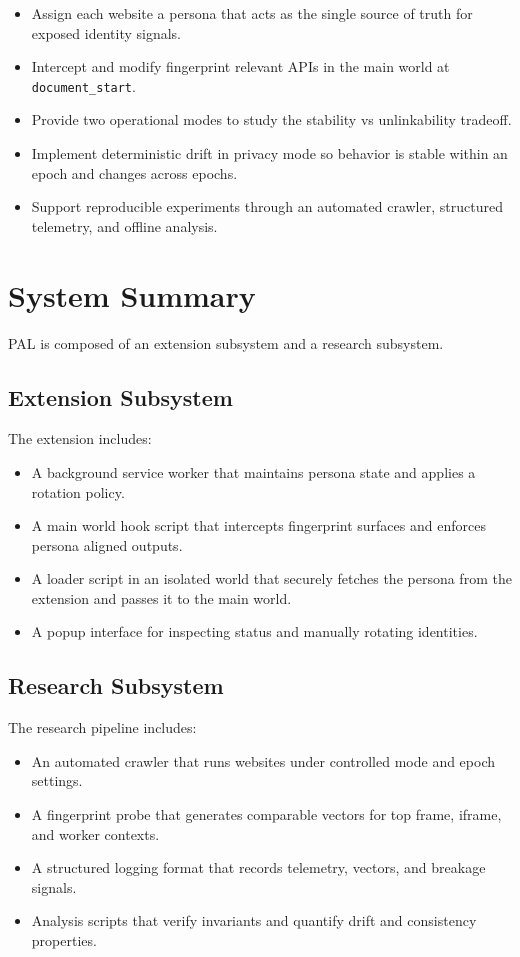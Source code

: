 \documentclass[11pt]{report}
\begin{document}
\begin{itemize}
    \item Assign each website a persona that acts as the single source of truth for exposed identity signals.
    \item Intercept and modify fingerprint relevant APIs in the main world at \texttt{document\_start}.
    \item Provide two operational modes to study the stability vs unlinkability tradeoff.
    \item Implement deterministic drift in privacy mode so behavior is stable within an epoch and changes across epochs.
    \item Support reproducible experiments through an automated crawler, structured telemetry, and offline analysis.
\end{itemize}

\section{System Summary}

PAL is composed of an extension subsystem and a research subsystem.

\subsection{Extension Subsystem}

The extension includes:

\begin{itemize}
    \item A background service worker that maintains persona state and applies a rotation policy.
    \item A main world hook script that intercepts fingerprint surfaces and enforces persona aligned outputs.
    \item A loader script in an isolated world that securely fetches the persona from the extension and passes it to the main world.
    \item A popup interface for inspecting status and manually rotating identities.
\end{itemize}

\subsection{Research Subsystem}

The research pipeline includes:

\begin{itemize}
    \item An automated crawler that runs websites under controlled mode and epoch settings.
    \item A fingerprint probe that generates comparable vectors for top frame, iframe, and worker contexts.
    \item A structured logging format that records telemetry, vectors, and breakage signals.
    \item Analysis scripts that verify invariants and quantify drift and consistency properties.
\end{itemize}
\end{document}
